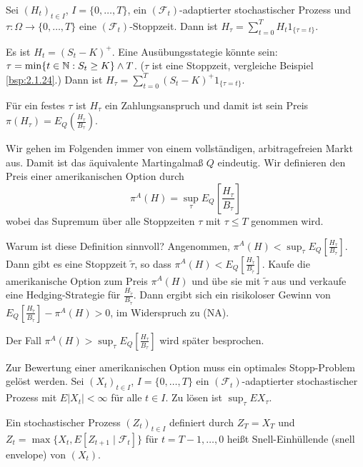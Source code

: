 \documentclass[a4paper,twoside,DIV15,BCOR12mm]{scrbook}
\newcommand{\cF}{\mathcal F}
\begin{document}
Sei $(H_t)_{t\in I}$, $I=\{0,\ldots,T\}$, ein $(\cF_t)$-adaptierter stochastischer Prozess und $\tau:\Omega \to\{0,\ldots,T\}$ eine $(\cF_t)$-Stoppzeit. Dann ist $H_\tau = \sum_{t=0}^T H_t 1_{\{\tau = t\}}$.

\begin{beispiel}
Es ist $H_t=(S_t-K)^+$. Eine Ausübungsstategie könnte sein: $\tau = \min\{t\in \mathbb{N}: S_t\ge K\} \wedge T$. ($\tau$ ist eine Stoppzeit, vergleiche Beispiel \ref{bsp:2.1.24}.) Dann ist
$H_\tau = \sum_{t=0}^T (S_t-K)^+ 1_{\{\tau = t\}}$.

Für ein festes $\tau$ ist $H_\tau$ ein Zahlungsanspruch und damit ist sein Preis $\pi(H_\tau) = E_Q(\frac{H_\tau}{B_\tau})$.
\end{beispiel}

\begin{bemerkung}
Wir gehen im Folgenden immer von einem vollständigen, arbitragefreien Markt aus. Damit ist das äquivalente Martingalmaß $Q$ eindeutig. Wir definieren den Preis einer amerikanischen Option durch 
\[
\pi^A(H) = \sup_{\tau}E_Q\left[\frac{H_\tau}{B_\tau}\right]
\]
wobei das Supremum über alle Stoppzeiten $\tau$ mit $\tau\le T$ genommen wird.

Warum ist diese Definition sinnvoll? Angenommen, $\pi^A(H) < \sup_{\tau}E_Q\left[\frac{H_\tau}{B_\tau}\right]$. Dann gibt es eine Stoppzeit $\tilde\tau$, so dass $\pi^A(H) < E_Q\left[ \frac{H_{\tilde\tau}}{B_{\tilde\tau}}\right]$. Kaufe die amerikanische Option zum Preis $\pi^A(H)$ und übe sie mit $\tilde\tau$ aus und verkaufe eine Hedging-Strategie für $\frac{H_{\tilde\tau}}{B_{\tilde\tau}}$. Dann ergibt sich ein risikoloser Gewinn von $E_Q\left[ \frac{H_{\tilde\tau}}{B_{\tilde\tau}}\right] -\pi^A(H) > 0$, im Widerspruch zu (NA).

Der Fall $\pi^A(H) > \sup_{\tau}E_Q\left[\frac{H_\tau}{B_\tau}\right]$ wird später besprochen.
\end{bemerkung}

Zur Bewertung einer amerikanischen Option muss ein optimales Stopp-Problem gelöst werden. Sei $(X_t)_{t\in I}$, $I=\{0,\ldots,T\}$ ein $(\cF_t)$-adaptierter stochastischer Prozess mit $E|X_t|<\infty$ für alle $t\in I$. Zu lösen ist $\sup_{\tau} EX_\tau$.

\begin{definition}
Ein stochastischer Prozess $(Z_t)_{t\in I}$ definiert durch
$Z_T = X_T$ und $Z_t = \max\{X_t, E[Z_{t+1}\mid \cF_t]\}$ für $t=T-1,\ldots,0$ heißt Snell-Einhüllende (snell envelope) von $(X_t)$.
\end{definition}
\end{document}
